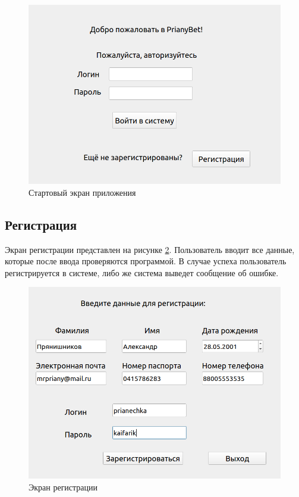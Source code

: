 \FloatBarrier
\begin{figure}[hp]	
	\begin{center}
		\includegraphics[width=\linewidth]{inc/start.png}
	\end{center}
	\caption{Стартовый экран приложения}
	\label{fig::start}
\end{figure}
\FloatBarrier

\subsection{Регистрация}
Экран регистрации представлен на рисунке \ref{fig::reg}. 
Пользователь вводит все данные, которые после ввода проверяются программой.
В случае успеха пользователь регистрируется в системе, либо же система выведет сообщение об ошибке.

\FloatBarrier
\begin{figure}[hp]	
	\begin{center}
		\includegraphics[width=\linewidth]{inc/registrate.png}
	\end{center}
	\caption{Экран регистрации}
	\label{fig::reg}
\end{figure}
\FloatBarrier

